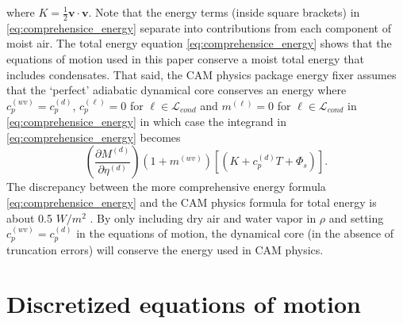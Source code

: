 \documentclass{agujournal}
\begin{document}
{where $K=\frac{1}{2}\mathbf{v}\cdot \mathbf{v}$. Note that the energy terms (inside square brackets) in \eqref{eq:comprehensice_energy} separate into contributions from each component of moist air. The total energy equation \eqref{eq:comprehensice_energy} shows that the equations of motion used in this paper conserve a moist total energy that includes condensates. That said, the CAM physics package energy fixer assumes that the `perfect' adiabatic dynamical core conserves an energy where $c_p^{(wv)}= c_p^{(d)}$, $c_p^{(\ell)}=0$ for $\ell\in \mathcal{L}_{cond}$ and $m^{(\ell)}=0$ for $\ell\in \mathcal{L}_{cond}$ in \eqref{eq:comprehensice_energy} \citep{WOHTTV2015JAMES} in which case the integrand in \eqref{eq:comprehensice_energy} becomes
\begin{equation}
\left( \frac{\partial M^{(d)}}{\partial \eta^{(d)}} \right)\left(1+m^{(wv)}\right)\left[ \left(K+c_p^{(d)}T+\Phi_s\right)\right].
\end{equation}
The discrepancy between the more comprehensive energy formula \eqref{eq:comprehensice_energy} and the CAM physics formula for total energy is about 0.5 $W/m^2$ \citep{T2011LNCSEb}. By only including dry air and water vapor   in $\rho$ and setting $c_p^{(wv)}= c_p^{(d)}$ in the equations of motion, the dynamical core (in the absence of truncation errors) will conserve the energy used in CAM physics. {}


\section{Discretized equations of motion}\label{sec:discretized_eqs}
}
\end{document}
